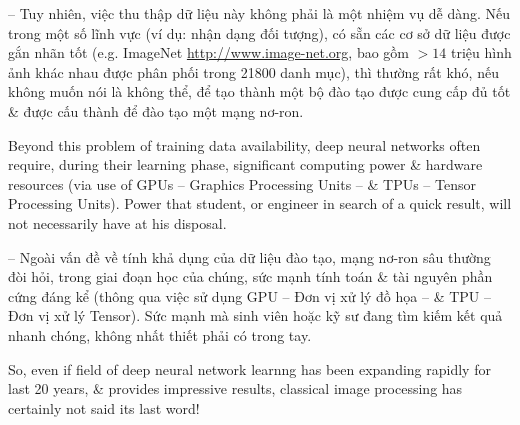 \documentclass{article}
\begin{document}
\begin{itemize}
\begin{itemize}
        -- Tuy nhiên, việc thu thập dữ liệu này không phải là một nhiệm vụ dễ dàng. Nếu trong một số lĩnh vực (ví dụ: nhận dạng đối tượng), có sẵn các cơ sở dữ liệu được gắn nhãn tốt (e.g. ImageNet \url{http://www.image-net.org}, bao gồm $> 14$ triệu hình ảnh khác nhau được phân phối trong 21800 danh mục), thì thường rất khó, nếu không muốn nói là không thể, để tạo thành một bộ đào tạo được cung cấp đủ tốt \& được cấu thành để đào tạo một mạng nơ-ron.
        
        Beyond this problem of training data availability, deep neural networks often require, during their learning phase, significant computing power \& hardware resources (via use of GPUs -- Graphics Processing Units -- \& TPUs -- Tensor Processing Units). Power that student, or engineer in search of a quick result, will not necessarily have at his disposal.
        
        -- Ngoài vấn đề về tính khả dụng của dữ liệu đào tạo, mạng nơ-ron sâu thường đòi hỏi, trong giai đoạn học của chúng, sức mạnh tính toán \& tài nguyên phần cứng đáng kể (thông qua việc sử dụng GPU -- Đơn vị xử lý đồ họa -- \& TPU -- Đơn vị xử lý Tensor). Sức mạnh mà sinh viên hoặc kỹ sư đang tìm kiếm kết quả nhanh chóng, không nhất thiết phải có trong tay.
        
        So, even if field of deep neural network learnng has been expanding rapidly for last 20 years, \& provides impressive results, classical image processing has certainly not said its last word!
        

\end{itemize}
\end{itemize}
\end{document}
